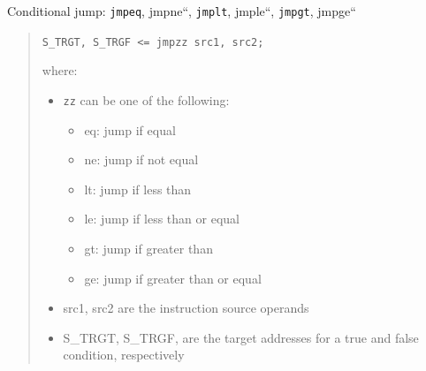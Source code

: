 \documentclass[a4paper]{article}
\begin{document}
Conditional jump: \texttt{jmpeq}, jmpne``, \texttt{jmplt}, jmple``, \texttt{jmpgt}, jmpge``
%
\begin{quote}

\texttt{S\_TRGT, S\_TRGF <= jmpzz src1, src2;}

where:
%
\begin{itemize}

\item \texttt{zz} can be one of the following:
%
\begin{itemize}

\item eq: jump if equal

\item ne: jump if not equal

\item lt: jump if less than

\item le: jump if less than or equal

\item gt: jump if greater than

\item ge: jump if greater than or equal

\end{itemize}

\item src1, src2 are the instruction source operands

\item S\_TRGT, S\_TRGF, are the target addresses for a true and false condition,
respectively

\end{itemize}

\end{quote}
\end{document}
